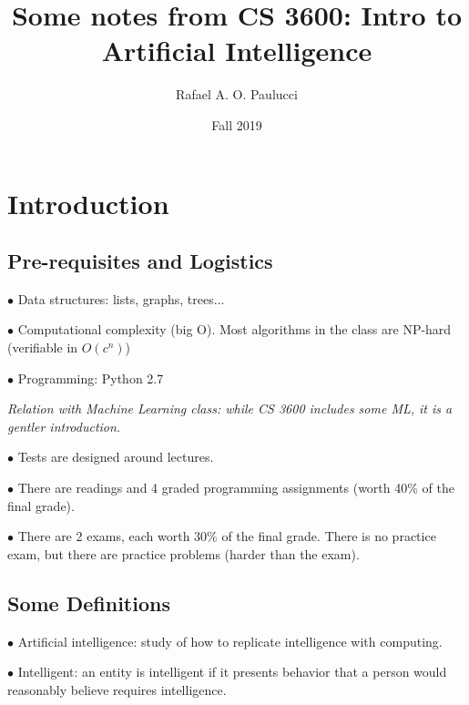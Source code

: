 \documentclass[english,openany]{book}
\begin{document}
    \title{Some notes from CS 3600: Intro to Artificial Intelligence}
    \author{Rafael A. O. Paulucci}
    \date{Fall 2019}

    \maketitle

    \tableofcontents


    \chapter{Introduction}

    \section{Pre-requisites and Logistics}

    $\bullet$ Data structures: lists, graphs, trees...

    $\bullet$ Computational complexity (big O). Most algorithms in the class are NP-hard (verifiable in $O(c^{n})$)

    $\bullet$ Programming: Python 2.7

    \textit{Relation with Machine Learning class: while CS 3600 includes some ML, it is a gentler introduction.}

    $\bullet$ Tests are designed around lectures.

    $\bullet$ There are readings and 4 graded programming assignments (worth 40\% of the final grade).

    $\bullet$ There are 2 exams, each worth 30\% of the final grade. There is no practice exam, but there are practice problems (harder than the exam).

    \section{Some Definitions}

    $\bullet$ Artificial intelligence: study of how to replicate intelligence with computing.

    $\bullet$ Intelligent: an entity is intelligent if it presents behavior that a person would reasonably believe requires intelligence.
\end{document}
